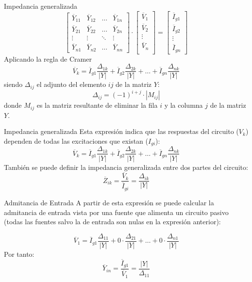 \documentclass[aspectratio=169, usenames,svgnames,dvipsnames]{beamer}
\begin{document}
\begin{frame}[label={sec:orgedb1cd5}]{Impedancia generalizada}
\begin{equation*}
  \begin{bmatrix}
    \overline{Y}_{11} & \overline{Y}_{12} & \dots & \overline{Y}_{1n} \\
    \overline{Y}_{21} & \overline{Y}_{22} & \dots & \overline{Y}_{2n} \\
    \vdots & \vdots & \ddots & \vdots \\
    \overline{Y}_{n1} & \overline{Y}_{n2} &  \dots & \overline{Y}_{nn}
  \end{bmatrix} \cdot %
  \begin{bmatrix}
    \overline{V}_1\\
    \overline{V}_2\\
    \vdots \\
    \overline{V}_n\\
  \end{bmatrix} = %
  \begin{bmatrix}
    \overline{I}_{g1}\\
    \overline{I}_{g2}\\
    \vdots \\
    \overline{I}_{gn}
  \end{bmatrix}
\end{equation*}
Aplicando la regla de Cramer
\[
  \overline{V}_k = \overline{I}_{g1} \frac{\Delta_{1k}}{|Y|} + \overline{I}_{g2} \frac{\Delta_{2k}}{|Y|} + \dots + \overline{I}_{gn} \frac{\Delta_{nk}}{|Y|}
\]
siendo \(\Delta_{ij}\) el adjunto del elemento \(ij\) de la matriz \(Y\):
\[
  \Delta_{ij} = (-1)^{i+j} \cdot |M_{ij}|
\]
donde \(M_{ij}\) es la matriz resultante de eliminar la fila \(i\) y la columna \(j\) de la matriz \(Y\).
\end{frame}

\begin{frame}[label={sec:org480d58a}]{Impedancia generalizada}
Esta expresión indica que las respuestas del circuito (\(V_k\)) dependen de todas las excitaciones que existan (\(I_{gi}\)):
\[
  \overline{V}_k = \overline{I}_{g1} \frac{\Delta_{1k}}{|Y|} + \overline{I}_{g2} \frac{\Delta_{2k}}{|Y|} + \dots + \overline{I}_{gn} \frac{\Delta_{nk}}{|Y|}
\]
También se puede definir la impedancia generalizada entre dos partes del circuito:
\[
  \overline{Z}_{ik} = \frac{\overline{V}_k}{\overline{I}_{gi}} = \frac{\Delta_{ik}}{|Y|}
\]
\end{frame}

\begin{frame}[label={sec:orgfff6b9f}]{Admitancia de Entrada}
A partir de esta expresión se puede calcular la admitancia de entrada vista por una fuente que alimenta un circuito pasivo (todas las fuentes salvo la de entrada son nulas en la expresión anterior):

\[
  \overline{V}_1 = \overline{I}_{g1} \frac{\Delta_{11}}{|Y|} + 0 \cdot \frac{\Delta_{21}}{|Y|} + \dots + 0 \cdot \frac{\Delta_{n1}}{|Y|}
\]
Por tanto:
\[
  \boxed{\overline{Y}_{in} = \frac{\overline{I}_{g1}}{\overline{V}_1}=  \frac{|Y|}{\Delta_{11}}}
\]
\end{frame}
\end{document}
